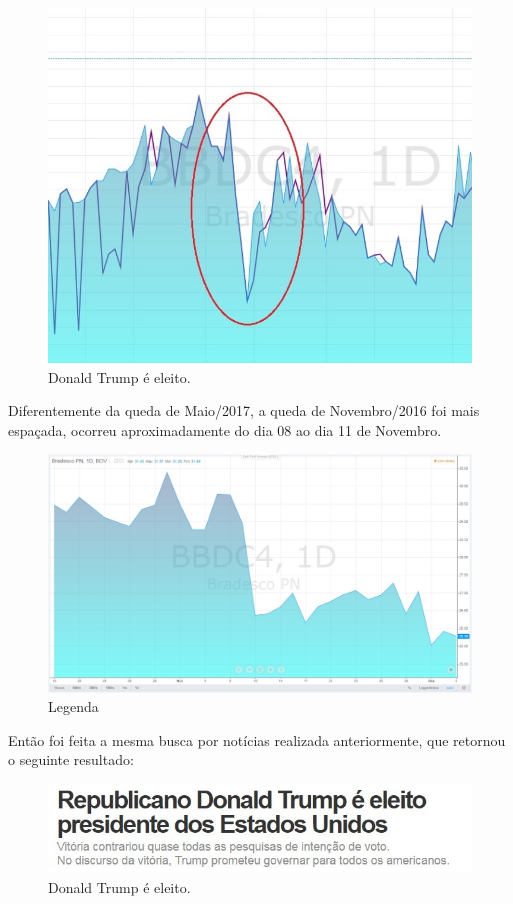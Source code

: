\documentclass{sigchi}
\begin{document}
\begin{figure}[!htb]
\centering
\includegraphics[scale=0.85]{./figures/queda-2016.jpg}
\caption{Donald Trump é eleito.}
\label{figRotu}
\end{figure}
Diferentemente da queda de Maio/2017, a queda de Novembro/2016 foi mais espaçada, ocorreu aproximadamente do dia 08 ao dia 11 de Novembro.

\begin{figure}[!htb]
	\centering
	\includegraphics[scale=0.5]{./figures/figura6.jpg}
	\caption{Legenda}
	\label{figRotu}
\end{figure}
Então foi feita a mesma busca por notícias realizada anteriormente, que retornou o seguinte resultado: 
\begin{figure}[!htb]
	\centering
	\includegraphics[scale=0.4]{./figures/figura7.jpg}
\caption{Donald Trump é eleito.}
	\label{figRotu}
\end{figure}
\end{document}
